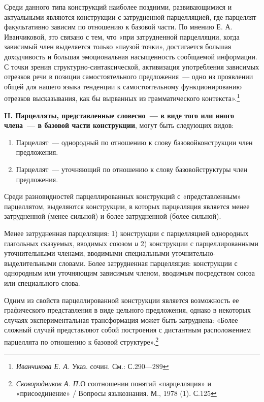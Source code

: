 \documentclass{kursa4}
\begin{document}
      Среди данного типа конструкций наиболее поздними,
      развивающимися и актуальными являются конструкции с затрудненной
      парцелляцией, где парцеллят факультативно зависим по отношению к
      базовой части. По мнению Е. А. Иванчиковой, это связано с тем, что «при
      затрудненной парцелляции, когда зависимый член выделяется только «паузой точки»,
      достигается большая доходчивость и большая эмоциональная насыщенность
      сообщаемой информации. С точки зрения структурно-синтаксической,
      активизация употребления зависимых отрезков речи в позиции
      самостоятельного предложения~--- одно из проявлении общей для нашего
      языка тенденции к самостоятельному функционированию отрезков
      высказывания, как бы вырванных из грамматического
      контекста».\footnote{\textit{ Иванчикова Е. А.
      }{Указ. сочин. См.: С.290—289}}

      \textbf{II. Парцелляты, представленные словесно~---
      в виде того или иного члена~--- в базовой части
      конструкции}, могут быть следующих видов:
      \begin{enumerate}
        \item {Парцеллят~--- однородный по отношению к слову
        базовой}{конструкции член
        предложения.}
        \item {Парцеллят~--- уточняющий по отношению к слову
        базовой}{структуры член
        предложения.}
      \end{enumerate}

      Среди разновидностей парцеллированных конструкций
      с «представленным» парцеллятом, выделяются конструкции, в которых
      парцелляция является менее затрудненной (менее сильной) и более
      затрудненной (более сильной).

      Менее затрудненная парцелляция: 1) конструкции с
      парцелляцией однородных глагольных сказуемых, вводимых союзом
      \textit{и }2) конструкции с
      парцеллированными уточнительными членами, вводимыми специальными
      уточнительно-выделительными словами. Более затрудненная парцелляция: конструкции с однородным или уточняющим зависимым
      членом, вводимым посредством союза или специального слова.

      Одним из свойств парцеллированной конструкции является возможность ее графического представления в виде цельного
      предложения, однако в некоторых случаях экспериментальная трансформация
      может быть затруднена: «Более сложный случай представляют собой построения с дистантным расположением парцеллята по отношению к базовой структуре».\footnote{\textit{{ Сковородников А. П.}}{О соотношении понятий «парцелляция» и «присоединение» / Вопросы языкознания. М., 1978 (1). С.125}}
\end{document}
